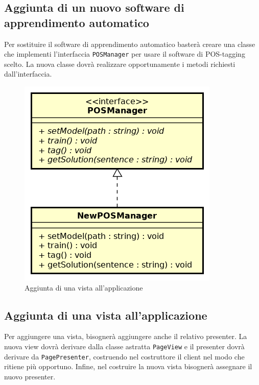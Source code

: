\subsection{Aggiunta di un nuovo software di apprendimento automatico}
Per sostituire il software di apprendimento automatico basterà creare una classe che implementi l'interfaccia \texttt{POSManager} per usare il software di POS-tagging scelto. La nuova classe dovrà realizzare opportunamente i metodi richiesti dall'interfaccia.\\
\vspace*{3em}

\begin{figure}[ht]
	\centering
	\includegraphics[scale=0.80]{images/newPOS.png}
	\caption{Aggiunta di una vista all'applicazione}
\end{figure}
\newpage

\subsection{Aggiunta di una vista all'applicazione}
Per aggiungere una vista, bisognerà aggiungere anche il relativo presenter. La nuova view dovrà derivare dalla classe astratta \texttt{PageView} e il presenter dovrà derivare da \texttt{PagePresenter}, costruendo nel costruttore il client nel modo che ritiene più opportuno. Infine, nel costruire la nuova vista bisognerà assegnare il nuovo presenter.\\
\vspace*{3em}

